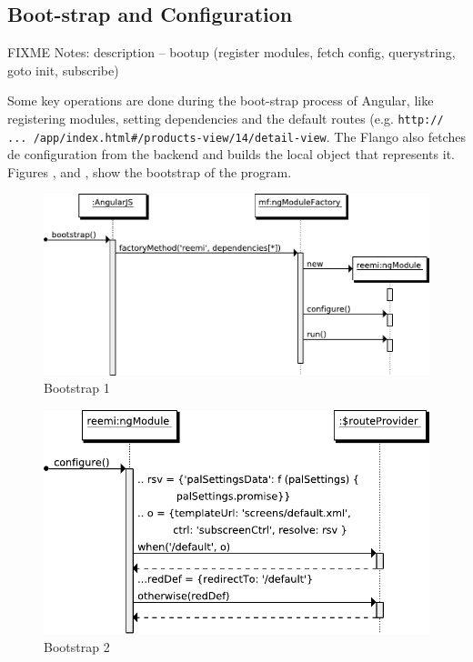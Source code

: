 \subsection{Boot-strap and Configuration}
FIXME Notes: description -- bootup (register modules, fetch config, querystring, goto init, subscribe)

Some key operations are done during the boot-strap process of Angular, like registering modules, setting dependencies and the default routes (e.g. \texttt{http:// ... /app/index.html\#/products-view/14/detail-view}.
The Flango \cm also fetches de configuration from the backend and builds the local object that represents it.
Figures ,  and , show the bootstrap of the program.

\begin{figure}[htb]
    \centering
    \includegraphics{figures/design/seqdia/bootstrap-1.pdf}
    \caption{Bootstrap 1}
    \label{fig:design-seqdia-bootstrap-1}
\end{figure}

\begin{figure}[htb]
    \centering
    \includegraphics{figures/design/seqdia/bootstrap-2.pdf}
    \caption{Bootstrap 2}
    \label{fig:design-seqdia-bootstrap-2}
\end{figure}

